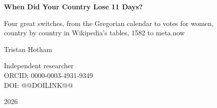 \documentclass[11pt,a4paper]{article}
\begin{document}
\begin{center}
{\Large\bfseries When Did Your Country Lose 11 Days?\par}
\vspace{0.4em}
{\large Four great switches, from the Gregorian calendar to votes for women,\\country by country in Wikipedia's tables, 1582 to {{meta.now}}\par}
\vspace{1.2em}
{\large Tristan Hotham\par}
\vspace{0.3em}
{\small Independent researcher\\
ORCID: 0000-0003-4931-9349\\
DOI: @@DOILINK@@\par}
\vspace{0.8em}
2026
\end{center}
\end{document}

